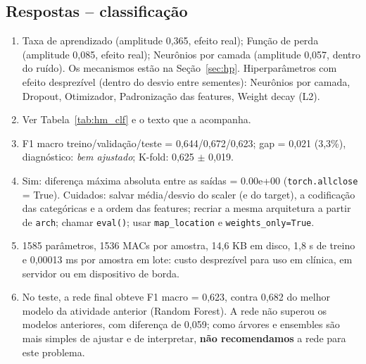 \documentclass[11pt,a4paper]{article}
\begin{document}
\subsection{Respostas -- classificação}
\begin{enumerate}[label=(\alph*)]
\item Taxa de aprendizado (amplitude 0,365, efeito real); Função de perda (amplitude 0,085, efeito real); Neurônios por camada (amplitude 0,057, dentro do ruído). Os mecanismos estão na Seção~\ref{sec:hp}. Hiperparâmetros com efeito desprezível (dentro do desvio entre sementes): Neurônios por camada, Dropout, Otimizador, Padronização das features, Weight decay (L2). %
\item Ver Tabela~\ref{tab:hm_clf} e o texto que a acompanha.
\item F1 macro treino/validação/teste = 0,644/0,672/0,623; gap = 0,021 (3,3\%), diagnóstico: \emph{bem ajustado}; K-fold: 0,625 $\pm$ 0,019.
\item Sim: diferença máxima absoluta entre as saídas = 0.00e+00 (\texttt{torch.allclose} = True). Cuidados: salvar média/desvio do scaler (e do target), a codificação das categóricas e a ordem das features; recriar a mesma arquitetura a partir de \texttt{arch}; chamar \texttt{eval()}; usar \texttt{map\_location} e \texttt{weights\_only=True}.
\item 1585 parâmetros, 1536 MACs por amostra, 14,6 KB em disco, 1,8 s de treino e 0,00013 ms por amostra em lote: custo desprezível para uso em clínica, em servidor ou em dispositivo de borda. %
\item No teste, a rede final obteve F1 macro = 0,623, contra 0,682 do melhor modelo da atividade anterior (Random Forest). A rede não superou os modelos anteriores, com diferença de 0,059; como árvores e ensembles são mais simples de ajustar e de interpretar, \textbf{não recomendamos} a rede para este problema. %
\end{enumerate}
\end{document}
